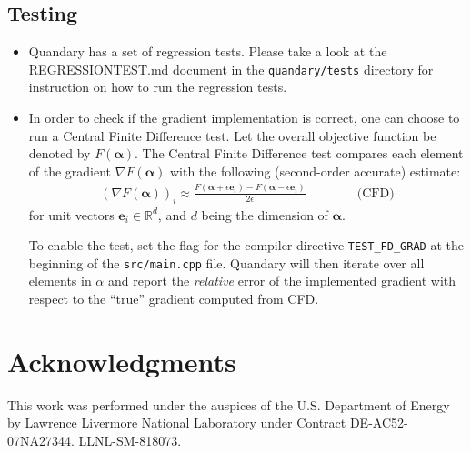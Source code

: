 \documentclass[11pt]{article}
\newcommand{\R}{\mathds{R}}
\newcommand{\bfa}{\boldsymbol{\alpha}}
\newcommand{\bs}[1]{{\boldsymbol{#1}}}
\begin{document}
\subsection{Testing}
  \begin{itemize}
    \item Quandary has a set of regression tests. Please take a look at the REGRESSIONTEST.md document in the \verb+quandary/tests+ directory for instruction on how to run the regression tests. 
    \item In order to check if the gradient implementation is correct, one can choose to run a Central Finite Difference test. Let the overall objective function be denoted by $F(\boldsymbol{\alpha})$. The Central Finite Difference test compares each element of the gradient $\nabla F(\boldsymbol{\alpha})$ with the following (second-order accurate) estimate:
    \begin{align*}
       \left(\nabla F(\boldsymbol{\alpha}) \right)_i \approx \frac{F(\bfa + \epsilon\bs{e}_i) - F(\bfa - \epsilon\bs{e}_i)}{2\epsilon} \qquad \qquad \text{(CFD)}
    \end{align*}
    for unit vectors $\bs{e}_i\in \R^d$, and $d$ being the dimension of $\bfa$. 

    To enable the test, set the flag for the compiler directive \texttt{TEST\_FD\_GRAD} at the beginning of the \texttt{src/main.cpp} file. Quandary will then iterate over all elements in $\alpha$ and report the \textit{relative} error of the implemented gradient with respect to the ``true'' gradient computed from CFD. 

  \end{itemize}

\section*{Acknowledgments}
This work was performed under the auspices of the U.S. Department of Energy by Lawrence
Livermore National Laboratory under Contract DE-AC52-07NA27344. LLNL-SM-818073. 

\end{document}
